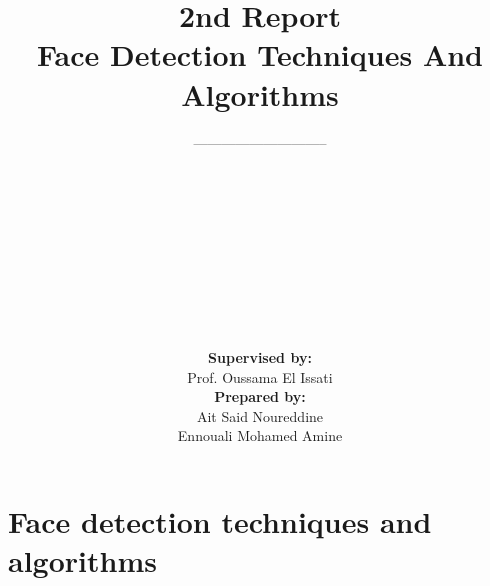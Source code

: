 \documentclass[a4paper,12pt]{report}
\begin{document}
\graphicspath{{images/}}


\title{2nd Report \\ \textbf{Face Detection Techniques And Algorithms}}
	\author{----------------------------- \\   \\  \\   \\   \\   \\  \\   \\   \\   \\   \\ \textbf{Supervised by:}\\ Prof. Oussama El Issati\\ \textbf{Prepared by:} \\ Ait Said Noureddine \\ Ennouali Mohamed Amine}
	\maketitle



\maketitle

\tableofcontents





\chapter{Face detection techniques and algorithms}
\end{document}
